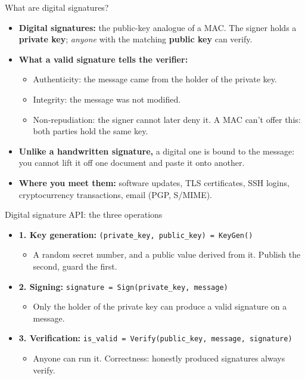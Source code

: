 \ifdefined\PRESENTATION\else\PassOptionsToClass{handout}{beamer}\fi\documentclass[aspectratio=169, lualatex]{beamer}
\begin{document}
\begin{frame}{What are digital signatures?}
	\begin{itemize}
		\item \textbf{Digital signatures:} the public-key analogue of a MAC. The signer holds a \textbf{private key}; \emph{anyone} with the matching \textbf{public key} can verify.
		\item \textbf{What a valid signature tells the verifier:}
		      \begin{itemize}[<+->]
			      \item Authenticity: the message came from the holder of the private key.
			      \item Integrity: the message was not modified.
			      \item Non-repudiation: the signer cannot later deny it. A MAC can't offer this: both parties hold the same key.
		      \end{itemize}
		\item \textbf{Unlike a handwritten signature,} a digital one is bound to the message: you cannot lift it off one document and paste it onto another.
		\item \textbf{Where you meet them:} software updates, TLS certificates, SSH logins, cryptocurrency transactions, email (PGP, S/MIME).
	\end{itemize}
\end{frame}

\begin{frame}{Digital signature API: the three operations}
	\begin{itemize}[<+->]
		\item \textbf{1. Key generation:} \texttt{(private\_key, public\_key) = KeyGen()}
		      \begin{itemize}
			      \item A random secret number, and a public value derived from it. Publish the second, guard the first.
		      \end{itemize}
		\item \textbf{2. Signing:} \texttt{signature = Sign(private\_key, message)}
		      \begin{itemize}
			      \item Only the holder of the private key can produce a valid signature on a message.
		      \end{itemize}
		\item \textbf{3. Verification:} \texttt{is\_valid = Verify(public\_key, message, signature)}
		      \begin{itemize}
			      \item Anyone can run it. Correctness: honestly produced signatures always verify.
		      \end{itemize}
	\end{itemize}
	\vspace{0.2cm}
\end{frame}
\end{document}
